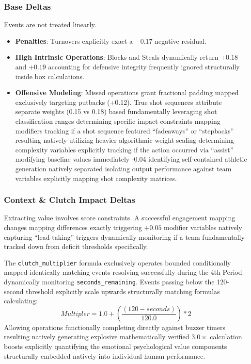 \documentclass[12pt,a4paper]{article}
\begin{document}
\subsubsection{Base Deltas}
Events are not treated linearly. 
\begin{itemize}
    \item \textbf{Penalties}: Turnovers explicitly exact a $-0.17$ negative residual.
    \item \textbf{High Intrinsic Operations}: Blocks and Steals dynamically return $+0.18$ and $+0.19$ accounting for defensive integrity frequently ignored structurally inside box calculations.
    \item \textbf{Offensive Modeling}: Missed operations grant fractional padding mapped exclusively targeting putbacks (+0.12). True shot sequences attribute separate weights (0.15 vs 0.18) based fundamentally leveraging shot classification ranges determining specific impact constraints mapping modifiers tracking if a shot sequence featured ``fadeaways'' or ``stepbacks'' resulting natively utilizing heavier algorithmic weight scaling determining complexity variables explicitly tracking if the action occurred via ``assist'' modifying baseline values immediately -0.04 identifying self-contained athletic generation natively separated isolating output performance against team variables explicitly mapping shot complexity matrices.
\end{itemize}

\subsubsection{Context \& Clutch Impact Deltas}
Extracting value involves score constraints. A successful engagement mapping changes mapping differences exactly triggering $+0.05$ modifier variables natively capturing ``lead-taking'' triggers dynamically monitoring if a team fundamentally tracked down from deficit thresholds specifically. 

The \texttt{clutch\_multiplier} formula exclusively operates bounded conditionally mapped identically matching events resolving successfully during the 4th Period dynamically monitoring \texttt{seconds\_remaining}. 
Events passing below the 120-second threshold explicitly scale upwards structurally matching formulas calculating:
\[ Multipler = 1.0 + \left(\frac{(120 - seconds)}{120.0}\right) * 2 \]
Allowing operations functionally completing directly against buzzer timers resulting natively generating explosive mathematically verified $3.0\times$ calculation boosts explicitly quantifying the emotional psychological value components structurally embedded natively into individual human performance. 
\end{document}
